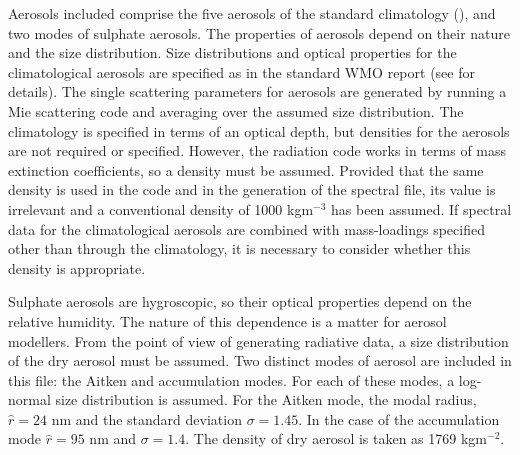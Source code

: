 \begin{enumerate}
Aerosols included comprise the five aerosols of the standard climatology
(\citet{Cusack98a}), and two modes of sulphate aerosols.
The properties of aerosols depend on their nature and the size distribution.
Size distributions and optical properties for the climatological aerosols
are specified as in the standard WMO report (see \citet{Cusack98a} for
details). 
The single scattering parameters for aerosols are generated by running a 
Mie scattering code and averaging over the assumed size distribution.
The climatology is specified in terms of an optical depth, but densities
for the aerosols are not required or specified. However, the radiation
code works in terms of mass extinction coefficients, so a density must
be assumed. Provided that the same density is used in the code and in
the generation of the spectral file, its value is irrelevant and a 
conventional density of 1000 kgm${}^{-3}$ has been assumed. If spectral
data for the climatological aerosols are combined with mass-loadings
specified other than through the climatology, it is necessary to
consider whether this density is appropriate.

Sulphate aerosols are hygroscopic, so their optical properties depend on
the relative humidity. The nature of this dependence is a matter for
aerosol modellers. From the point of view of generating radiative data,
a size distribution of the dry aerosol must be assumed. Two distinct
modes of aerosol are included in this file: the Aitken and accumulation
modes. For each of these modes, a log-normal size distribution is assumed.
For the Aitken mode, the modal radius, $\hat r = 24$ nm and the 
standard deviation $\sigma=1.45$. In the case of the accumulation mode
$\hat r = 95$ nm and $\sigma=1.4$. The density of dry aerosol is taken
as 1769 kgm${}^{-2}$.


\end{enumerate}
